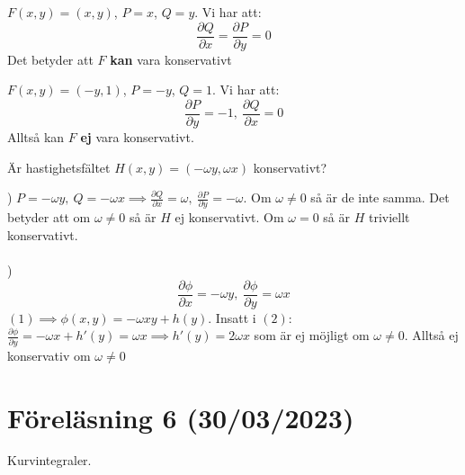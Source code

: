 \documentclass{report}
\begin{document}
\ex{}
{
$ F(x,y) = (x,y) $, $ P = x $, $ Q = y $. Vi har att:
\begin{equation*}
\frac{\partial Q }{\partial x } = \frac{\partial P }{\partial y } = 0
\end{equation*}
Det betyder att $ F $ \textbf{kan} vara konservativt
}

\ex{}
{
$ F(x,y) = (-y,1) $, $ P = -y $, $ Q = 1 $. Vi har att:
\begin{equation*}
\frac{\partial P }{\partial y } = -1, \: \frac{\partial Q }{\partial x } = 0 
\end{equation*}
Alltså kan $ F $ \textbf{ej} vara konservativt.
}

\qs{}
{
Är hastighetsfältet $ H(x,y) = (-\omega y, \omega x) $ konservativt?
}

) $  P = -\omega y, \: Q = -\omega x \implies \frac{\partial Q }{\partial x } = \omega, \: \frac{\partial P }{\partial y } = -\omega $. Om $ \omega \ne 0$ så är de inte samma. Det betyder att om $ \omega \ne 0 $ så är $ H $ ej konservativt. Om $ \omega = 0 $ så är $ H $ triviellt konservativt.  \\\\

) \begin{equation*}
\frac{\partial \phi }{\partial  x} = - \omega y, \: \frac{\partial \phi  }{\partial y } = \omega x 
\end{equation*}
$ (1) \implies \phi (x,y) = - \omega xy + h(y) $. Insatt i $ (2) $: $ \frac{\partial \phi  }{\partial y } = - \omega x + h'(y) = \omega x \implies h'(y) = 2\omega x $ som är ej möjligt om $ \omega \ne 0 $. Alltså ej konservativ om $ \omega \ne 0 $ 

\pagebreak
\section{Föreläsning 6 (30/03/2023)}
Kurvintegraler.\\\\
\end{document}
